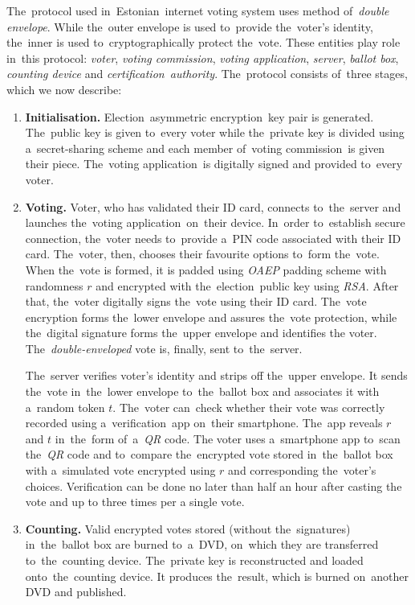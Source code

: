 The~protocol used in~Estonian~internet voting system uses method of~\emph{double envelope}. While the~outer envelope is used to~provide the~voter's identity, the~inner is used to~cryptographically protect the~vote. These entities play role in~this protocol: \emph{voter}, \emph{voting commission}, \emph{voting application}, \emph{server}, \emph{ballot box}, \emph{counting device} and \emph{certification~authority}. 
\bigbreak
The~protocol consists of~three stages, which we now describe: 
\begin{enumerate}
\item \textbf{Initialisation.} Election~asymmetric encryption~key pair is generated. The~public key is given to~every voter while the~private key is divided using a~secret-sharing scheme and each member of~voting commission~is given their piece. The~voting application~is digitally signed and provided to~every voter.
\item {\textbf{Voting.} Voter, who has validated their ID card, connects to~the~server and launches the~voting application~on~their device. In~order to~establish secure connection, the~voter needs to~provide a~PIN code associated with their ID card. The~voter, then, chooses their favourite options to~form the~vote. When the~vote is formed, it is padded using \emph{OAEP} padding scheme with randomness $r$ and encrypted with the~election~public key using \emph{RSA}. After that, the~voter digitally signs the~vote using their ID card. The~vote encryption forms the~lower envelope and assures the~vote protection, while the~digital signature forms the~upper envelope and identifies the voter. The~\emph{double-enveloped} vote is, finally, sent to~the~server. 

The~server verifies voter's identity and strips off the~upper envelope. It sends the~vote in~the~lower envelope to~the~ballot box and associates it with a~random token $t$. The~voter can~check whether their vote was correctly recorded using a~verification~app on~their smartphone. The~app reveals $r$ and $t$ in~the~form of~a~\emph{QR} code. The voter uses a~smartphone app to~scan the~\emph{QR} code and to~compare the~encrypted vote stored in~the~ballot box with a~simulated vote encrypted using $r$ and corresponding the~voter's choices. Verification can be done no later than half an hour after casting the vote and up to three times per a single vote.}
\item \textbf{Counting.} Valid encrypted votes stored (without the~signatures) in~the~ballot box are burned to~a~DVD, on~which they are transferred to~the~counting device. The~private key is reconstructed and loaded onto~the~counting device. It produces the~result, which is burned on~another DVD and published.
\end{enumerate}
